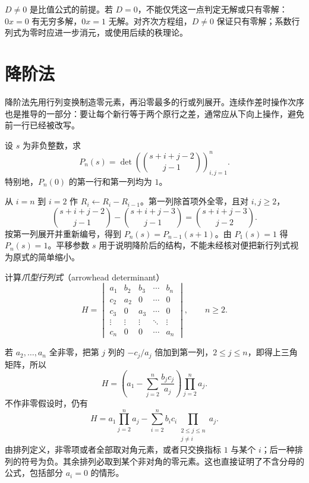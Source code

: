 $D\ne0$ 是比值公式的前提。若 $D=0$，不能仅凭这一点判定无解或只有零解：$0x=0$ 有无穷多解，$0x=1$ 无解。对齐次方程组，$D\ne0$ 保证只有零解；系数行列式为零时应进一步消元，或使用后续的秩理论。

\section{降阶法}
\label{sec:xie-ex-det-reduction}

降阶法先用行列变换制造零元素，再沿零最多的行或列展开。连续作差时操作次序也是推导的一部分：要让每个新行等于两个原行之差，通常应从下向上操作，避免前一行已经被改写。

\begin{example}
\label{ex:xie-ex-det-binomial}
设 $s$ 为非负整数，求
\[
P_n(s)=\det\left(\binom{s+i+j-2}{j-1}\right)_{i,j=1}^{n}.
\]
特别地，$P_n(0)$ 的第一行和第一列均为 $1$。
\end{example}

\begin{solve}
从 $i=n$ 到 $i=2$ 作 $R_i\leftarrow R_i-R_{i-1}$。第一列除首项外全零，且对 $i,j\geq2$，
\[
\binom{s+i+j-2}{j-1}-\binom{s+i+j-3}{j-1}
=\binom{s+i+j-3}{j-2}.
\]
按第一列展开并重新编号，得到 $P_n(s)=P_{n-1}(s+1)$。由 $P_1(s)=1$ 得 $P_n(s)=1$。平移参数 $s$ 用于说明降阶后的结构，不能未经核对便把新行列式视为原式的简单缩小。
\end{solve}

\begin{example}
\label{ex:xie-ex-det-arrow}
计算\emph{爪型行列式}（arrowhead determinant）
\[
H=\begin{vmatrix}
a_1&b_2&b_3&\cdots&b_n\\
c_2&a_2&0&\cdots&0\\
c_3&0&a_3&\cdots&0\\
\vdots&\vdots&\vdots&\ddots&\vdots\\
c_n&0&0&\cdots&a_n
\end{vmatrix},\qquad n\geq2.
\]
\end{example}

\begin{solve}
若 $a_2,\ldots,a_n$ 全非零，把第 $j$ 列的 $-c_j/a_j$ 倍加到第一列，$2\leq j\leq n$，即得上三角矩阵，所以
\begin{equation}
\label{eq:xie-ex-det-arrow-nonzero}
H=\left(a_1-\sum_{j=2}^{n}\frac{b_jc_j}{a_j}\right)\prod_{j=2}^{n}a_j.
\end{equation}
不作非零假设时，仍有
\begin{equation}
\label{eq:xie-ex-det-arrow-polynomial}
H=a_1\prod_{j=2}^{n}a_j-
\sum_{i=2}^{n}b_ic_i\prod_{\substack{2\leq j\leq n\\j\ne i}}a_j.
\end{equation}
由排列定义，非零项或者全部取对角元素，或者只交换指标 $1$ 与某个 $i$；后一种排列的符号为负。其余排列必取到某个非对角的零元素。这也直接证明了不含分母的公式，包括部分 $a_i=0$ 的情形。
\end{solve}

